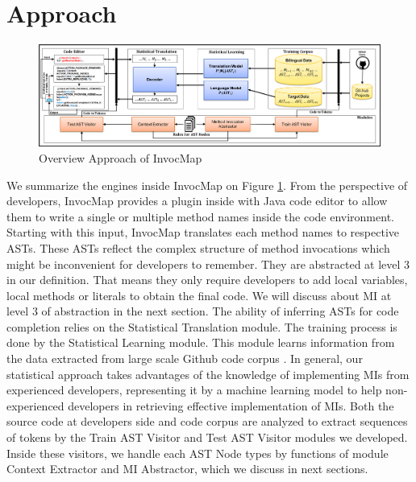 \section{Approach}
\begin{figure}[]
 \centering
  \includegraphics[width=\linewidth]{ApproachOverview.png}
  \caption{Overview Approach of InvocMap }
  \label{fig:ApproachOverview}
\end{figure}
We summarize the engines inside InvocMap on Figure \ref{fig:ApproachOverview}. From the perspective of developers, InvocMap provides a plugin inside with Java code editor to allow them to write a single or multiple method names inside the code environment. Starting with this input, InvocMap translates each method names to respective ASTs. These ASTs reflect the complex structure of method invocations which might be inconvenient for developers to remember. They are abstracted at level 3 in our definition. That means they only require developers to add local variables, local methods or literals to obtain the final code. We will discuss about MI at level 3 of abstraction in the next section. The ability of inferring ASTs for code completion relies on the Statistical Translation module. The training process is done by the Statistical Learning module. This module learns information from the data extracted from large scale Github code corpus  \cite{id:Github}. In general, our statistical approach takes advantages of the knowledge of implementing MIs from experienced developers, representing it by a machine learning model to help non-experienced developers in retrieving effective implementation of MIs. Both the source code at developers side and code corpus are analyzed to extract sequences of tokens by the Train AST Visitor and Test AST Visitor modules we developed. Inside these visitors, we handle each AST Node types by functions of module Context Extractor and MI Abstractor, which we discuss in next sections.
